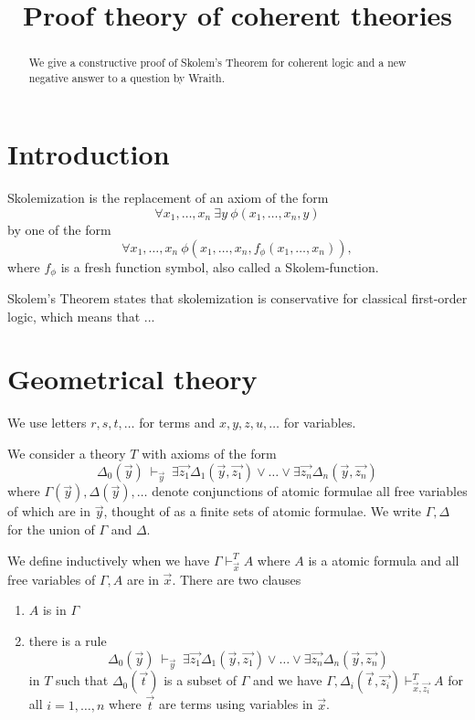 \documentclass[10pt,a4paper]{article}
\newcommand{\many}[2]{{#1_1},\ldots,{#1_#2}}
\begin{document}
\title{Proof theory of coherent theories}

\author{}
\date{}
\maketitle

\begin{abstract}
We give a constructive proof of Skolem's Theorem for coherent logic
and a new negative answer to a question by Wraith.
\end{abstract}


\section*{Introduction}
Skolemization is the replacement of an axiom of the form
\[\forall\many{x}{n}~\exists y~\phi(\many{x}{n},y)\]
by one of the form
\[\forall\many{x}{n}~\phi(\many{x}{n},f_\phi(\many{x}{n})),\]
where $f_\phi$ is a fresh function symbol, also called a Skolem-function.

Skolem's Theorem states that skolemization is conservative for classical 
first-order logic, which means that ...



\section{Geometrical theory}
 
 We use letters $r,s,t,\dots$ for terms and $x,y,z,u,\dots$ for variables.

\medskip

 We consider a theory $T$ with axioms of the form
$$
\Delta_0(\vec{y})~\vdash_{\vec{y}}~
\exists \vec{z_1}\Delta_1(\vec{y},\vec{z_1})\vee\dots\vee\exists \vec{z_n}\Delta_n(\vec{y},\vec{z_n})
$$
where $\Gamma(\vec{y}), \Delta(\vec{y}),\dots$ denote conjunctions of atomic formulae
all free variables of which are in $\vec{y}$, thought of as a finite sets of atomic formulae.
We write $\Gamma,\Delta$ for the union of $\Gamma$ and $\Delta$.

 We define inductively when we have $\Gamma\vdash_{\vec{x}}^T A$ where $A$ is a atomic formula
and all free variables of $\Gamma,A$ are in $\vec{x}$. There are two clauses

\begin{enumerate}
\item $A$ is in $\Gamma$

\item there is a rule
$$
\Delta_0(\vec{y})~\vdash_{\vec{y}}~
\exists \vec{z_1}\Delta_1(\vec{y},\vec{z_1})\vee\dots\vee\exists \vec{z_n}\Delta_n(\vec{y},\vec{z_n})
$$
in $T$ such that $\Delta_0(\vec{t})$ is a subset of $\Gamma$ and
we have $\Gamma,\Delta_i(\vec{t},\vec{z_i})\vdash^T_{\vec{x},\vec{z_i}} A$ for all $i = 1,\dots,n$
where $\vec{t}$ are terms using variables in $\vec{x}$.
\end{enumerate}
\end{document}
